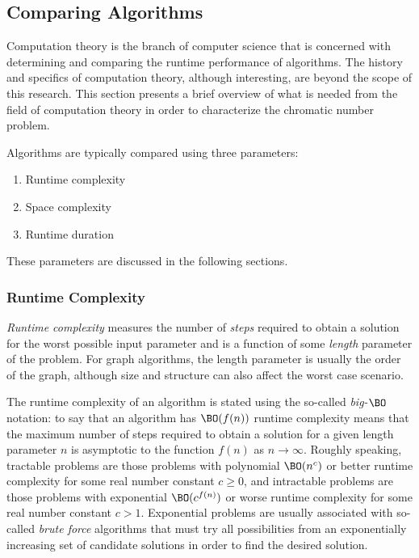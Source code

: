 \subsection{Comparing Algorithms}\label{sec:sub:compare}

Computation theory is the branch of computer science that is concerned with determining and comparing the runtime
performance of algorithms.  The history and specifics of computation theory, although interesting, are beyond the
scope of this research.  This section presents a brief overview of what is needed from the field of computation
theory in order to characterize the chromatic number problem.

Algorithms are typically compared using three parameters:
\begin{enumerate}
\item Runtime complexity
\item Space complexity
\item Runtime duration
\end{enumerate}

These parameters are discussed in the following sections.

\subsubsection{Runtime Complexity}\label{sec:sub:sub:runtime}

\emph{Runtime complexity} measures the number of \emph{steps} required to obtain a solution for the worst possible
input parameter and is a function of some \emph{length} parameter of the problem.  For graph algorithms, the length
parameter is usually the order of the graph, although size and structure can also affect the worst case scenario.

The runtime complexity of an algorithm is stated using the so-called \emph{big-\(\BO\)} notation: to say that an
algorithm has \(\BO(f(n))\) runtime complexity means that the maximum number of steps required to obtain a solution
for a given length parameter \(n\) is asymptotic to the function \(f(n)\) as \(n\to\infty\).  Roughly speaking,
tractable problems are those problems with polynomial \(\BO(n^c)\) or better runtime complexity for some real
number constant \(c\ge0\), and intractable problems are those problems with exponential \(\BO(c^{f(n)})\) or worse
runtime complexity for some real number constant \(c>1\).  Exponential problems are usually associated with
so-called \emph{brute force} algorithms that must try all possibilities from an exponentially increasing set of
candidate solutions in order to find the desired solution.

